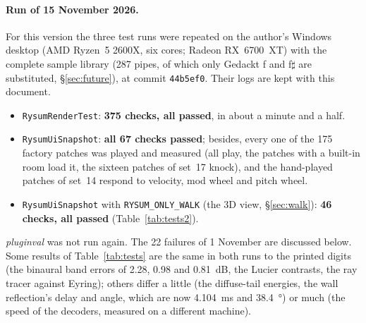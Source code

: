 \documentclass[11pt,a4paper,parskip=half,DIV=11,toc=bibliography]{scrartcl}
\newcommand{\code}[1]{\texttt{#1}}
\newcommand{\fn}[1]{\mbox{\texttt{#1}}}
\begin{document}
\paragraph{Run of 15 November 2026.} For this version the three test runs were repeated on the author's Windows desktop (AMD Ryzen~5 2600X, six
cores; Radeon RX~6700~XT) with the complete sample library (287 pipes, of which only Gedackt f and f$\sharp$ are substituted, \S\ref{sec:future}),
at commit \code{44b5ef0}. Their logs are kept with this document.
\begin{itemize}
  \item \fn{RysumRenderTest}: \textbf{375 checks, all passed}, in about a minute and a half.
  \item \fn{RysumUiSnapshot}: \textbf{all 67 checks passed}; besides, every one of the 175 factory patches was played and measured (all play,
        the patches with a built-in room load it, the sixteen patches of set~17 knock), and the hand-played patches of set~14 respond to velocity,
        mod wheel and pitch wheel.
  \item \fn{RysumUiSnapshot} with \code{RYSUM\_ONLY\_WALK} (the 3D view, \S\ref{sec:walk}): \textbf{46 checks, all passed}
        (Table~\ref{tab:tests2}).
\end{itemize}
\emph{pluginval} was not run again. The 22 failures of 1 November are discussed below. Some results of Table~\ref{tab:tests} are the same in
both runs to the printed digits (the binaural band errors of 2.28, 0.98 and \SI{0.81}{dB}, the Lucier contrasts, the ray tracer against Eyring);
others differ a little (the diffuse-tail energies, the wall reflection's delay and angle, which are now \SI{4.104}{ms} and \SI{38.4}{\degree}) or
much (the speed of the decoders, measured on a different machine).
\end{document}
